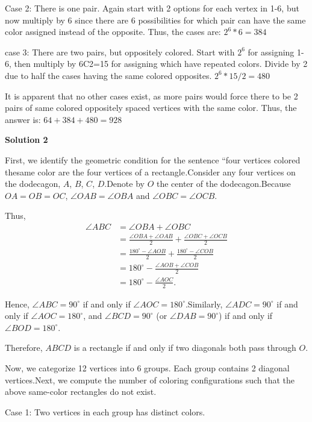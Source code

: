 \begin{enumerate}
 Case 2: There is one pair. Again start with 2 options for each vertex in 1-6, but now multiply by 6 since there are 6 possibilities for which pair can have the same color assigned instead of the opposite. Thus, the cases are: $2^6*6=384$

 case 3: There are two pairs, but oppositely colored. Start with $2^6$ for assigning 1-6, then multiply by 6C2=15 for assigning which have repeated colors. Divide by 2 due to half the cases having the same colored opposites. $2^6*15/2=480$

 It is apparent that no other cases exist, as more pairs would force there to be 2 pairs of same colored oppositely spaced vertices with the same color. Thus, the answer is: $64+384+480=\boxed{928}$




\textbf{Solution 2}

First, we identify the geometric condition for the sentence ``four vertices colored thesame color are the four vertices of a rectangle\textit{.}Consider any four vertices on the dodecagon, $A$, $B$, $C$, $D$.Denote by $O$ the center of the dodecagon.Because $OA = OB = OC$, $\angle OAB = \angle OBA$ and $\angle OBC = \angle OCB$.

 Thus,
 \begin{align*} \angle ABC & = \angle OBA + \angle OBC \\ & = \frac{\angle OBA + \angle OAB}{2} + \frac{\angle OBC + \angle OCB}{2} \\ & = \frac{180^\circ - \angle AOB}{2} +  \frac{180^\circ - \angle COB}{2} \\ & = 180^\circ - \frac{\angle AOB + \angle COB}{2} \\ & = 180^\circ - \frac{\angle AOC}{2} . \end{align*}


 Hence, $\angle ABC = 90^\circ$ if and only if $\angle AOC = 180^\circ$.Similarly, $\angle ADC = 90^\circ$ if and only if $\angle AOC = 180^\circ$, and $\angle BCD = 90^\circ$ (or $\angle DAB = 90^\circ$) if and only if $\angle BOD = 180^\circ$.

 Therefore, $ABCD$ is a rectangle if and only if two diagonals both pass through $O$.

 Now, we categorize 12 vertices into 6 groups. Each group contains 2 diagonal vertices.Next, we compute the number of coloring configurations such that the above same-color rectangles do not exist.

 Case 1: Two vertices in each group has distinct colors.


\end{enumerate}
